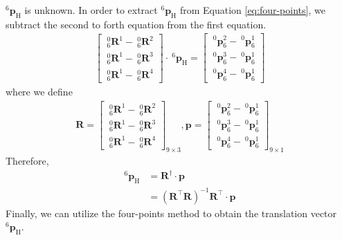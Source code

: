 \newpage
\noindent
$^\mathrm{6}\!\boldsymbol{p}_\mathrm{H}$ is unknown. In order to extract $^\mathrm{6}\!\boldsymbol{p}_\mathrm{H}$ from Equation \ref{eq:four-points}, we subtract the second to forth equation from the first equation.
\begin{equation}
\begin{split}	
\begin{bmatrix}
\  _{\mathrm{6}}^{\mathrm{0}}\mathbf{R}^{1} - \  _{\mathrm{6}}^{\mathrm{0}}\mathbf{R}^{2}\\ 
\  _{\mathrm{6}}^{\mathrm{0}}\mathbf{R}^{1} - \  _{\mathrm{6}}^{\mathrm{0}}\mathbf{R}^{3}\\ 
\  _{\mathrm{6}}^{\mathrm{0}}\mathbf{R}^{1} - \  _{\mathrm{6}}^{\mathrm{0}}\mathbf{R}^{4}
\end{bmatrix}
\cdot\ ^\mathrm{6}\!\boldsymbol{p}_\mathrm{H}
=
\begin{bmatrix}
\ ^\mathrm{0}\!\boldsymbol{p}_\mathrm{6}^{2} -\ ^\mathrm{0}\!\boldsymbol{p}_\mathrm{6}^{1} \\ 
\ ^\mathrm{0}\!\boldsymbol{p}_\mathrm{6}^{3} -\ ^\mathrm{0}\!\boldsymbol{p}_\mathrm{6}^{1} \\ 
\ ^\mathrm{0}\!\boldsymbol{p}_\mathrm{6}^{4} -\ ^\mathrm{0}\!\boldsymbol{p}_\mathrm{6}^{1} 
\end{bmatrix}
\end{split}
\end{equation}
where we define
\begin{equation*}
\begin{split}
\mathbf{R} =  
\begin{bmatrix}
\  _{\mathrm{6}}^{\mathrm{0}}\mathbf{R}^{1} - \  _{\mathrm{6}}^{\mathrm{0}}\mathbf{R}^{2}\\ 
\  _{\mathrm{6}}^{\mathrm{0}}\mathbf{R}^{1} - \  _{\mathrm{6}}^{\mathrm{0}}\mathbf{R}^{3}\\ 
\  _{\mathrm{6}}^{\mathrm{0}}\mathbf{R}^{1} - \  _{\mathrm{6}}^{\mathrm{0}}\mathbf{R}^{4}
\end{bmatrix}_{9 \times 3}, 
\boldsymbol{p} = 
\begin{bmatrix}
\ ^\mathrm{0}\!\boldsymbol{p}_\mathrm{6}^{2} -\ ^\mathrm{0}\!\boldsymbol{p}_\mathrm{6}^{1} \\ 
\ ^\mathrm{0}\!\boldsymbol{p}_\mathrm{6}^{3} -\ ^\mathrm{0}\!\boldsymbol{p}_\mathrm{6}^{1} \\ 
\ ^\mathrm{0}\!\boldsymbol{p}_\mathrm{6}^{4} -\ ^\mathrm{0}\!\boldsymbol{p}_\mathrm{6}^{1} 
\end{bmatrix}_{9 \times 1}
\end{split}
\end{equation*}
Therefore,
\begin{equation*}
\begin{split}
^\mathrm{6}\!\boldsymbol{p}_\mathrm{H} 	&= \mathbf{R}^{\dagger} \cdot \boldsymbol{p}\\
					  							&= \left( \mathbf{R}^\top\mathbf{R}\right) ^{-1}\mathbf{R}^\top \cdot \boldsymbol{p}
\end{split}
\end{equation*}
Finally, we can utilize the four-points method to obtain the translation vector $^\mathrm{6}\!\boldsymbol{p}_\mathrm{H} $.
